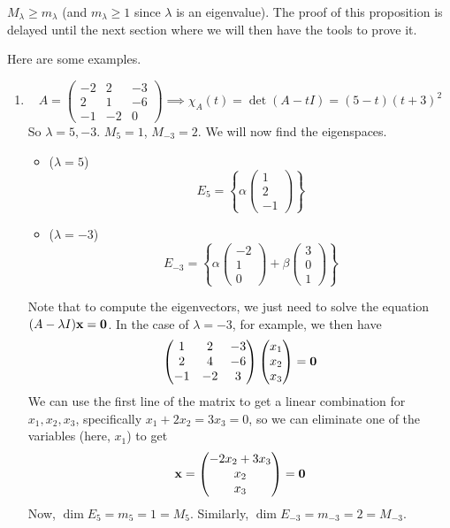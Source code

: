\begin{proposition}
	\(M_\lambda \geq m_\lambda\) (and \(m_\lambda \geq 1\) since \(\lambda\) is an eigenvalue).
	The proof of this proposition is delayed until the next section where we will then have the tools to prove it.
\end{proposition}
Here are some examples.
\begin{enumerate}
	\item
	      \[
		      A = \begin{pmatrix}
			      -2 & 2 & -3 \\ 2 & 1 & -6 \\ -1 & -2 & 0
		      \end{pmatrix} \implies \chi_A(t) = \det(A - tI) = (5-t)(t+3)^2
	      \]
	      So \(\lambda = 5, -3\).
	      \(M_5 = 1\), \(M_{-3} = 2\).
	      We will now find the eigenspaces.
	      \begin{itemize}
		      \item (\(\lambda = 5\))
		            \[
			            E_5 = \left\{ \alpha\begin{pmatrix}
				            1 \\ 2 \\ -1
			            \end{pmatrix} \right\}
		            \]
		      \item (\(\lambda = -3\))
		            \[
			            E_{-3} = \left\{ \alpha\begin{pmatrix}
				            -2 \\ 1 \\ 0
			            \end{pmatrix} + \beta\begin{pmatrix}
				            3 \\ 0 \\ 1
			            \end{pmatrix} \right\}
		            \]
	      \end{itemize}
	      Note that to compute the eigenvectors, we just need to solve the equation \((A - \lambda I)\vb x = \vb 0\).
	      In the case of \(\lambda = -3\), for example, we then have
	      \[
		      \begin{pmatrix}
			      1 & 2 & -3 \\ 2 & 4 & -6 \\ -1 & -2 & 3
		      \end{pmatrix} \begin{pmatrix}
			      x_1 \\ x_2 \\ x_3
		      \end{pmatrix} = \vb 0
	      \]
	      We can use the first line of the matrix to get a linear combination for \(x_1, x_2, x_3\), specifically \(x_1 + 2x_2 = 3x_3 = 0\), so we can eliminate one of the variables (here, \(x_1\)) to get
	      \[
		      \vb x = \begin{pmatrix}
			      -2x_2 + 3x_3 \\ x_2 \\ x_3
		      \end{pmatrix} = \vb 0
	      \]
	      Now, \(\dim E_5 = m_5 = 1 = M_5\).
	      Similarly, \(\dim E_{-3} = m_{-3} = 2 = M_{-3}\).


\end{enumerate}
